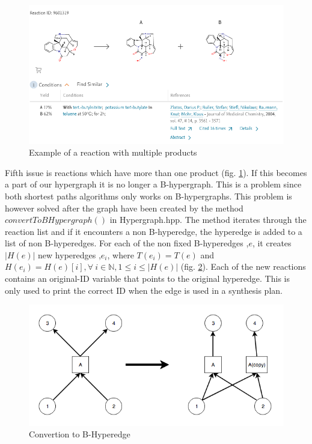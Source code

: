 \documentclass[a4paper,10pt,titlepage]{paper}
\begin{document}
\begin{figure}[H]
\hspace{-1cm}
\includegraphics[scale=0.5]{Billeder/MultipleProducts.png}
\caption{Example of a reaction with multiple products}
\label{fig::MultipleProducts}
\end{figure}
Fifth issue is reactions which have more than one product (fig. \ref{fig::MultipleProducts}). If this becomes a part of our hypergraph it is no longer a B-hypergraph. This is a problem since both shortest paths algorithms only works on B-hypergraphs. This problem is however solved after the graph have been created by the method $convertToBHypergraph()$ in Hypergraph.hpp. The method iterates through the reaction list and if it encounters a non B-hyperedge, the hyperedge is added to a list of non B-hyperedges. For each of the non fixed B-hyperedges ,$e$, it creates $|H(e)|$ new hyperedges ,$e_i$, where $T(e_i)=T(e)$ and $H(e_i) = H(e)[i], \forall\ i \in \mathbb{N}, 1 \leq i\leq|H(e)|$  (fig. \ref{fig::CopyReaction}). Each of the new reactions contains an original-ID variable that points to the original hyperedge. This is only used to print the correct ID when the edge is used in a synthesis plan.

\begin{figure}[H]
\includegraphics[scale=0.5]{Billeder/CopyReaction.png}
\caption{Convertion to B-Hyperedge}
\label{fig::CopyReaction}
\end{figure}
\end{document}
